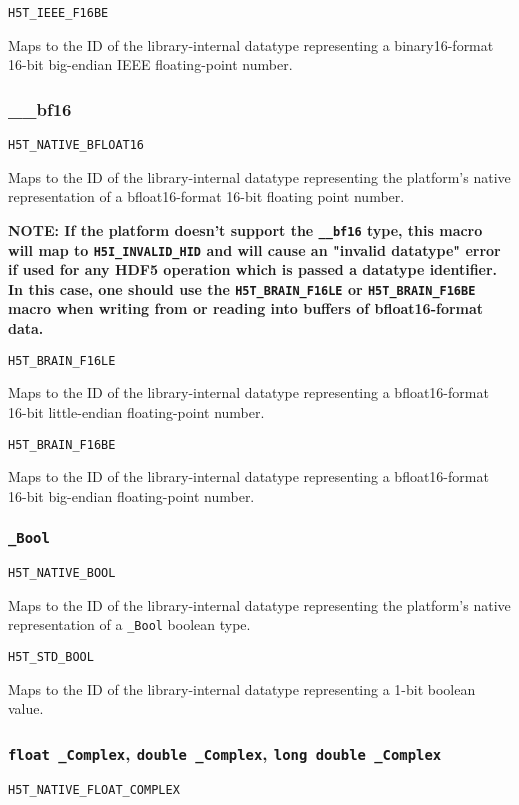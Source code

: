 \documentclass[../HDF5_RFC.tex]{subfiles}
\begin{document}
\texttt{H5T\_IEEE\_F16BE}

Maps to the ID of the library-internal datatype representing a binary16-format 16-bit
big-endian IEEE floating-point number.

\subsubsection{\_\_bf16}

\texttt{H5T\_NATIVE\_BFLOAT16}

Maps to the ID of the library-internal datatype representing the platform's native representation
of a bfloat16-format 16-bit floating point number.

\textbf{NOTE: If the platform doesn't support the \texttt{\_\_bf16} type, this macro will map to
\texttt{H5I\_INVALID\_HID} and will cause an "invalid datatype" error if used for any HDF5 operation
which is passed a datatype identifier. In this case, one should use the \texttt{H5T\_BRAIN\_F16LE} or
\texttt{H5T\_BRAIN\_F16BE} macro when writing from or reading into buffers of bfloat16-format data.}

\texttt{H5T\_BRAIN\_F16LE}

Maps to the ID of the library-internal datatype representing a bfloat16-format 16-bit
little-endian floating-point number.

\texttt{H5T\_BRAIN\_F16BE}

Maps to the ID of the library-internal datatype representing a bfloat16-format 16-bit
big-endian floating-point number.

\subsubsection{\texttt{\_Bool}}

\texttt{H5T\_NATIVE\_BOOL}

Maps to the ID of the library-internal datatype representing the platform's native representation
of a \texttt{\_Bool} boolean type.

\texttt{H5T\_STD\_BOOL}

Maps to the ID of the library-internal datatype representing a 1-bit boolean value.

\subsubsection{\texttt{float \_Complex}, \texttt{double \_Complex}, \texttt{long double \_Complex}}

\texttt{H5T\_NATIVE\_FLOAT\_COMPLEX}
\end{document}
